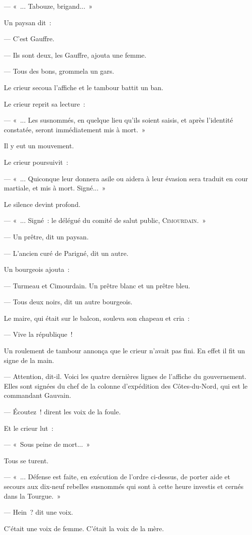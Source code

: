 \documentclass[french,twoside]{book} %
\begin{document}
— « ... Tabouze, brigand... »\par
Un paysan dit :\par
— C’est Gauffre.\par
— Ils sont deux, les Gauffre, ajouta une femme.\par
— Tous des bons, grommela un gars.\par
Le crieur secoua l’affiche et le tambour battit un ban.\par
Le crieur reprit sa lecture :\par
— « ... Les susnommés, en quelque lieu qu’ils soient saisis, et après l’identité constatée, seront immédiatement mis à mort. »\par
Il y eut un mouvement.\par
Le crieur poursuivit :\par
— « ... Quiconque leur donnera asile ou aidera à leur évasion sera traduit en cour martiale, et mis à mort. Signé... »\par
Le silence devint profond.\par
— « ... Signé : le délégué du comité de salut public, C{\scshape imourdain}. »\par
 — Un prêtre, dit un paysan.\par
— L’ancien curé de Parigné, dit un autre.\par
Un bourgeois ajouta :\par
— Turmeau et Cimourdain. Un prêtre blanc et un prêtre bleu.\par
— Tous deux noirs, dit un autre bourgeois.\par
Le maire, qui était sur le balcon, souleva son chapeau et cria :\par
— Vive la république !\par
Un roulement de tambour annonça que le crieur n’avait pas fini. En effet il fit un signe de la main.\par
— Attention, dit-il. Voici les quatre dernières lignes de l’affiche du gouvernement. Elles sont signées du chef de la colonne d’expédition des Côtes-du-Nord, qui est le commandant Gauvain.\par
— Écoutez ! dirent les voix de la foule.\par
Et le crieur lut :\par
— « Sous peine de mort... »\par
Tous se turent.\par
— « ... Défense est faite, en exécution de l’ordre ci-dessus, de porter aide et secours aux dix-neuf rebelles susnommés qui sont à cette heure investis et cernés dans la Tourgue. »\par
— Hein ? dit une voix.\par
C’était une voix de femme. C’était la voix de la mère.
\end{document}

